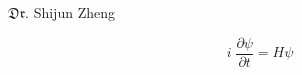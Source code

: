 \documentclass[12pt]{amsart}
\begin{document}
\begin{center}
\begin{huge}
$\mathfrak{Dr}$. %
{Shijun\; Zheng}%
\end{huge}
\end{center}

\date{}

\vspace{.2in}
\begin{large}
$$ i \; \frac{\partial\psi}{\partial t}= H \psi$$
\end{large}


\end{document}
